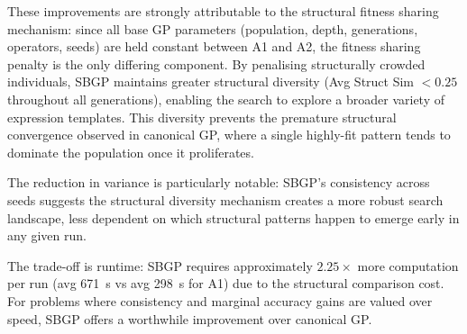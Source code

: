 \documentclass[12pt,a4paper]{article}
\begin{document}
These improvements are strongly attributable to the structural fitness sharing
mechanism: since all base GP parameters (population, depth, generations, operators,
seeds) are held constant between A1 and A2, the fitness sharing penalty is the
only differing component. By penalising structurally crowded individuals, SBGP
maintains greater structural diversity (Avg Struct Sim $< 0.25$ throughout all
generations), enabling the search to explore a broader variety of expression
templates. This diversity prevents the premature structural convergence observed
in canonical GP, where a single highly-fit pattern tends to dominate the population
once it proliferates.

The reduction in variance is particularly notable: SBGP's consistency across seeds
suggests the structural diversity mechanism creates a more robust search landscape,
less dependent on which structural patterns happen to emerge early in any given run.

The trade-off is runtime: SBGP requires approximately $2.25\times$ more computation
per run (avg 671~s vs avg 298~s for A1) due to the structural comparison cost.
For problems where consistency and marginal accuracy gains are valued over speed,
SBGP offers a worthwhile improvement over canonical GP.
\end{document}
